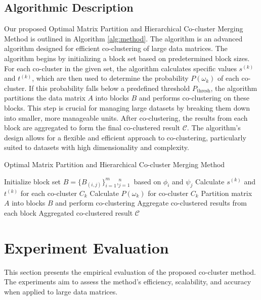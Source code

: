 \documentclass[journal]{IEEEtran}
\begin{document}
\subsection{Algorithmic Description}
Our proposed  Optimal Matrix Partition and Hierarchical Co-cluster Merging Method is outlined in Algorithm \ref{alg:method}. The algorithm
is an advanced algorithm designed for efficient co-clustering of large data matrices. The algorithm begins by initializing a block set based on predetermined block sizes. For each co-cluster in the given set, the algorithm calculates specific values $s^{(k)}$ and $t^{(k)}$, which are then used to determine the probability $P(\omega_k)$ of each co-cluster. If this probability falls below a predefined threshold $P_{\text{thresh}}$, the algorithm partitions the data matrix $A$ into blocks $B$ and performs co-clustering on these blocks. This step is crucial for managing large datasets by breaking them down into smaller, more manageable units. After co-clustering, the results from each block are aggregated to form the final co-clustered result $\mathcal{C}$. The algorithm's design allows for a flexible and efficient approach to co-clustering, particularly suited to datasets with high dimensionality and complexity.

\begin{algorithm}[!t]
  \caption{Optimal Matrix Partition and Hierarchical Co-cluster Merging Method}\label{alg:method}
  \begin{algorithmic}[1]
    \STATE Initialize block set $B = \{B_{(i,j)}\}_{i=1}^m,_{j=1}^n$ based on $\phi_i$ and $\psi_j$
    \STATE Calculate $s^{(k)}$ and $t^{(k)}$ for each co-cluster $C_k$
    \STATE Calculate $P(\omega_k)$ for co-cluster $C_k$
    \STATE Partition matrix $A$ into blocks $B$ and perform co-clustering
    \STATE Aggregate co-clustered results from each block
    \ENDIF
    \ENDFOR
    \RETURN Aggregated co-clustered result $\mathcal{C}$
  \end{algorithmic}
\end{algorithm}


\section{Experiment Evaluation}
\label{sec:experiment}
This section presents the empirical evaluation of the proposed co-cluster method. The experiments aim to assess the method's efficiency, scalability, and accuracy when applied to large data matrices.
\end{document}
